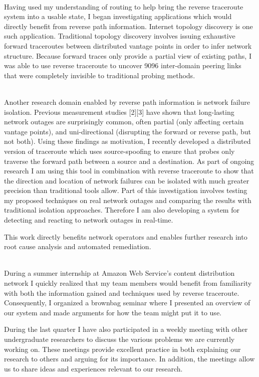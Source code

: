 \documentclass[12pt]{article}	%
\begin{document}
 \\
\indent Having used my understanding of routing to help bring the reverse traceroute
system into a usable state, I began investigating 
applications which would directly benefit from reverse path information.
Internet topology discovery is one such application. Traditional topology
discovery involves issuing exhaustive forward traceroutes between distributed vantage
points in order to infer network structure. Because forward traces only
provide a partial view of existing paths, I was able to use
reverse traceroute to uncover 9096 inter-domain peering links that were
completely invisible to traditional probing methods.

 \\
\indent Another research domain enabled by reverse path information is network
failure isolation. Previous measurement studies [2][3] have shown  
that long-lasting network outages are surprisingly common, often partial (only
affecting certain vantage points), and uni-directional (disrupting the forward
or reverse path, but not both). Using these findings as motivation, I
recently developed a distributed version of traceroute which uses
source-spoofing to ensure that probes only traverse the forward path between a
source and a destination. As part of ongoing research I am using this tool in combination with reverse
traceroute to show that the direction and location of network failures can be
isolated with much greater precision than traditional tools allow. Part of
this investigation involves testing my proposed techniques on real network
outages and comparing the results with traditional isolation approaches. Therefore I am
also developing a system for detecting and reacting to network outages in
real-time.

This work directly benefits network operators and enables further research into root cause analysis and
automated remediation.

 \\
\indent During a summer internship at Amazon Web Service's content
distribution network I quickly realized that my team members would benefit
from familiarity with both the information gained and techniques used by reverse traceroute. Consequently, I
organized a brownbag seminar where I presented an overview of our system and made arguments for
how the team might put it to use.

During the last quarter I have also participated in a weekly meeting with other
undergraduate researchers to discuss the various problems we are currently
working on. These meetings provide excellent practice in both explaining our
research to others and arguing for its importance. In addition, the meetings
allow us to share ideas and experiences relevant to our research.
\end{document}
